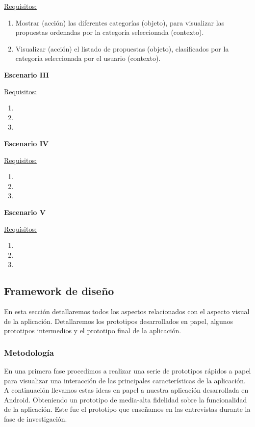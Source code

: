 \underline{Requisitos:}

\begin{enumerate}
\item Mostrar (acción) las diferentes categorías (objeto), para visualizar las propuestas ordenadas por la categoría seleccionada (contexto).
\item Visualizar (acción) el listado de propuestas (objeto), clasificados por la categoría seleccionada por el usuario (contexto).
\end{enumerate}

\textbf{Escenario III}

\underline{Requisitos:}

\begin{enumerate}
\item
\item
\item
\end{enumerate}

\textbf{Escenario IV}

\underline{Requisitos:}

\begin{enumerate}
\item
\item
\item
\end{enumerate}

\textbf{Escenario V}

\underline{Requisitos:}

\begin{enumerate}
\item
\item
\item
\end{enumerate}

\subsection{Framework de diseño} \label{ssec:prototypes}

En esta sección detallaremos todos los aspectos relacionados con el aspecto visual de la aplicación. Detallaremos los prototipos desarrollados en papel, algunos prototipos intermedios y el prototipo final de la aplicación.

\subsubsection{Metodología} 

En una primera fase procedimos a realizar una serie de prototipos rápidos a papel para visualizar una interacción de las principales características de la aplicación. A continuación llevamos estas ideas en papel a nuestra aplicación desarrollada en Android. Obteniendo un prototipo de media-alta fidelidad sobre la funcionalidad de la aplicación. Este fue el prototipo que enseñamos en las entrevistas durante la fase de investigación.

